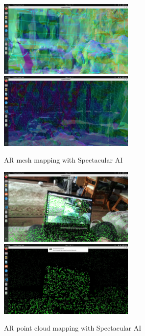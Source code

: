 \begin{figure}[htbp]
	\centering
	\includegraphics[width=67mm, keepaspectratio]{figures_jpg/spectacular_ai_mapping_ar_mesh1.jpg}\hspace{1cm}
	\includegraphics[width=67mm, keepaspectratio]{figures_jpg/spectacular_ai_mapping_ar_mesh2.jpg}\\\vspace{5mm}
	\caption{AR mesh mapping with Spectacular AI}
    \label{fig:SPAI_mesh_mapping}
\end{figure}

\begin{figure}[htbp]
	\centering
	\includegraphics[width=67mm, keepaspectratio]{figures_jpg/spectacular_ai_mapping_ar_pc1.jpg}\hspace{1cm}
	\includegraphics[width=67mm, keepaspectratio]{figures_jpg/spectacular_ai_mapping_ar_pc2.jpg}\\\vspace{5mm}
	\caption{AR point cloud mapping with Spectacular AI}
    \label{fig:SPAI_point_cloud_mapping}
\end{figure}

